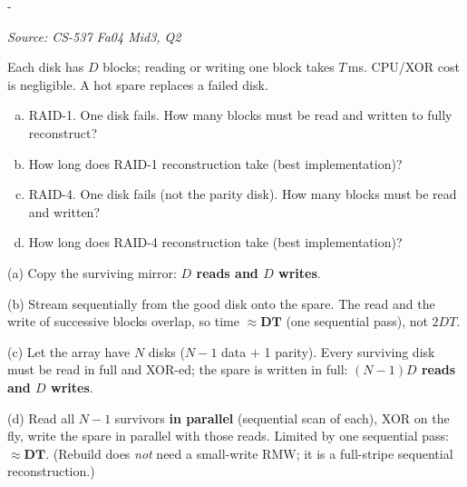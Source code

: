 \documentclass[11pt,a4paper]{article}
\makeatletter
\newcommand{\keepspace}[1]{\par\penalty-100\begingroup
  \setlength{\dimen@}{#1}\dimen@ii\pagegoal\advance\dimen@ii-\pagetotal
  \ifdim\dimen@>\dimen@ii\ifdim\dimen@ii>\z@\vfil\fi\break\fi\endgroup}
\newcounter{qn}[section]
\newenvironment{Qn}[4]{%
  \refstepcounter{qn}\keepspace{7\baselineskip}%
  \begin{tcolorbox}[qboxstyle, title={Q\thesection.\theqn\ \ [#1 \textbar\ #2]\ \ #4}]%
  {\footnotesize\color{g3}\textit{Source: #3}}\par\smallskip%
}{%
  \end{tcolorbox}%
}
\newenvironment{Sol}{%
  \begin{tcolorbox}[sboxstyle, title={Solution}]%
}{%
  \end{tcolorbox}\vspace{0.35em}%
}
\makeatother
\begin{document}
\begin{Qn}{Medium-Hard}{Lect 22A}{CS-537 Fa04 Mid3, Q2}{RAID-1 and RAID-4 reconstruction onto a hot spare}
Each disk has $D$ blocks; reading or writing one block takes $T$\,ms.
CPU/XOR cost is negligible. A hot spare replaces a failed disk.
\begin{enumerate}[(a)]
\item RAID-1. One disk fails. How many blocks must be read and written
      to fully reconstruct?
\item How long does RAID-1 reconstruction take (best implementation)?
\item RAID-4. One disk fails (not the parity disk). How many blocks
      must be read and written?
\item How long does RAID-4 reconstruction take (best implementation)?
\end{enumerate}
\end{Qn}
\begin{Sol}
(a) Copy the surviving mirror: \textbf{$D$ reads and $D$ writes}.

(b) Stream sequentially from the good disk onto the spare. The read and
the write of successive blocks overlap, so time $\boldsymbol{\approx DT}$
(one sequential pass), not $2DT$.

(c) Let the array have $N$ disks ($N-1$ data $+$ 1 parity). Every
surviving disk must be read in full and XOR-ed; the spare is written in
full: \textbf{$(N-1)D$ reads and $D$ writes}.

(d) Read all $N-1$ survivors \textbf{in parallel} (sequential scan of
each), XOR on the fly, write the spare in parallel with those reads.
Limited by one sequential pass: $\boldsymbol{\approx DT}$.
(Rebuild does \emph{not} need a small-write RMW; it is a full-stripe
sequential reconstruction.)
\end{Sol}
\end{document}
